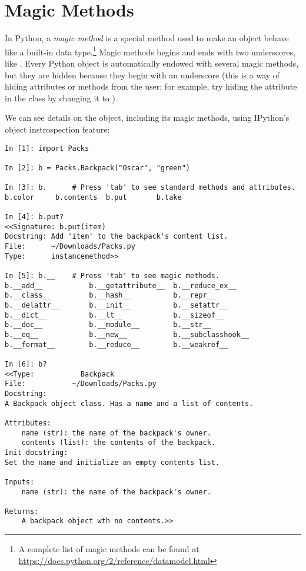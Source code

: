 \section*{Magic Methods}

In Python, a \emph{magic method} is a special method used to make an object behave like a built-in data type.\footnote{A complete list of magic methods can be found at \url{https://docs.python.org/2/reference/datamodel.html}}%
Magic methods begins and ends with two underscores, like .
Every Python object is automatically endowed with several magic methods, but they are hidden because they begin with an underscore (this is a way of hiding attributes or methods from the user; for example, try hiding the  attribute in the  class by changing it to ).

We can see details on the  object, including its magic methods, using IPython's object instrospection feature:

\begin{lstlisting}
In [1]: import Packs

In [2]: b = Packs.Backpack("Oscar", "green")

In [3]: b.      # Press 'tab' to see standard methods and attributes.
b.color     b.contents  b.put       b.take

In [4]: b.put?
<<Signature: b.put(item)
Docstring: Add 'item' to the backpack's content list.
File:      ~/Downloads/Packs.py
Type:      instancemethod>>

In [5]: b.__	# Press 'tab' to see magic methods.
b.__add__           b.__getattribute__  b.__reduce_ex__
b.__class__         b.__hash__          b.__repr__
b.__delattr__       b.__init__          b.__setattr__
b.__dict__          b.__lt__            b.__sizeof__
b.__doc__           b.__module__        b.__str__
b.__eq__            b.__new__           b.__subclasshook__
b.__format__        b.__reduce__        b.__weakref__

In [6]: b?
<<Type:           Backpack
File:           ~/Downloads/Packs.py
Docstring:
A Backpack object class. Has a name and a list of contents.

Attributes:
    name (str): the name of the backpack's owner.
    contents (list): the contents of the backpack.
Init docstring:
Set the name and initialize an empty contents list.

Inputs:
    name (str): the name of the backpack's owner.

Returns:
    A backpack object wth no contents.>>
\end{lstlisting}

